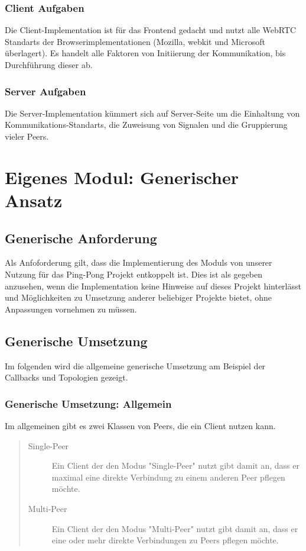 \subsubsection{Client Aufgaben}
Die Client-Implementation ist für das Frontend gedacht und nutzt alle WebRTC 
Standarts der Browserimplementationen (Mozilla, webkit und Microsoft überlagert). 
Es handelt alle Faktoren von Initiierung der Kommunikation, bis Durchführung dieser ab.



\subsubsection{Server Aufgaben}
Die Server-Implementation kümmert sich auf Server-Seite um die Einhaltung von 
Kommunikations-Standarts, die Zuweisung von Signalen und die Gruppierung vieler 
Peers.



\section{Eigenes Modul: Generischer Ansatz}

\subsection{Generische Anforderung}
Als Anfoforderung gilt, dass die Implementierung des Moduls von unserer Nutzung für das Ping-Pong Projekt entkoppelt ist. Dies ist als gegeben anzusehen, wenn die Implementation keine Hinweise auf dieses Projekt hinterlässt und Möglichkeiten zu Umsetzung anderer beliebiger Projekte bietet, ohne Anpassungen vornehmen zu müssen.



\subsection{Generische Umsetzung}
Im folgenden wird die allgemeine generische Umsetzung am Beispiel der Callbacks und Topologien gezeigt.

\subsubsection{Generische Umsetzung: Allgemein}
Im allgemeinen gibt es zwei Klassen von Peers, die ein Client nutzen kann.

\begin{quote}
  \begin{description}
  \item[Single-Peer]
  Ein Client der den Modus "Single-Peer" nutzt gibt damit an, dass er maximal eine direkte Verbindung zu einem anderen Peer pflegen möchte.

  \item[Multi-Peer]
  Ein Client der den Modus "Multi-Peer" nutzt gibt damit an, dass er eine oder mehr direkte Verbindungen zu Peers pflegen möchte.
  \end{description}
\end{quote}

